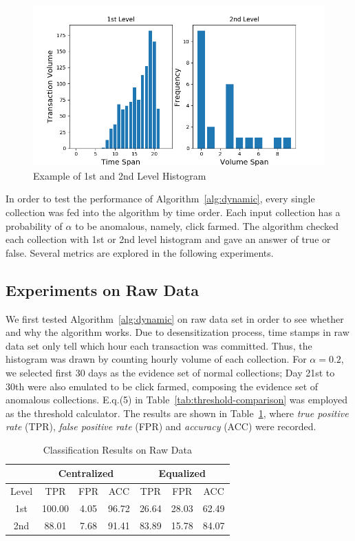 \documentclass[10pt,conference,letterpaper]{IEEEtran}
\begin{document}
			\begin{figure}[!t]
				\centering
				\includegraphics[width=\linewidth]{fig/HistogramExample.png}
				\caption{Example of 1st and 2nd Level Histogram}
				\label{fig:histogram-example}
			\end{figure}
	
			In order to test the performance of Algorithm~\ref{alg:dynamic}, every single collection was fed into the algorithm by time order. Each input collection has a probability of $\alpha$ to be anomalous, namely, click farmed. The algorithm checked each collection with 1st or 2nd level histogram and gave an answer of true or false. Several metrics are explored in the following experiments.
			
		\subsection{Experiments on Raw Data}\label{sec:exp-raw}
			We first tested Algorithm~\ref{alg:dynamic} on raw data set in order to see whether and why the algorithm works. Due to desensitization process, time stamps in raw data set only tell which hour each transaction was committed. Thus, the histogram was drawn by counting hourly volume of each collection. For $\alpha = 0.2$, we selected first 30 days as the evidence set of normal collections; Day 21st to 30th were also emulated to be click farmed, composing the evidence set of anomalous collections. E.q.(5) in Table~\ref{tab:threshold-comparison} was employed as the threshold calculator. The results are shown in Table~\ref{tab:result-raw-1st}, where \textit{true positive rate} (TPR), \textit{false positive rate} (FPR) and \textit{accuracy} (ACC) were recorded.
	
			\begin{table}[!ht]
				\centering
				\caption{Classification Results on Raw Data}
				\label{tab:result-raw-1st}
				\begin{tabular}{|c|c|c|c|c|c|c|}
					\hline
					& \multicolumn{3}{c|}{Centralized} & \multicolumn{3}{c|}{Equalized}\\
					\hline
					Level & TPR & FPR & ACC & TPR & FPR & ACC\\
					\hline
					1st & 100.00 & 4.05 & 96.72 & 26.64 & 28.03 & 62.49\\
					\hline
					2nd & 88.01 & 7.68 & 91.41 & 83.89 & 15.78 & 84.07\\
					\hline
				\end{tabular}
			\end{table}
			
\end{document}
